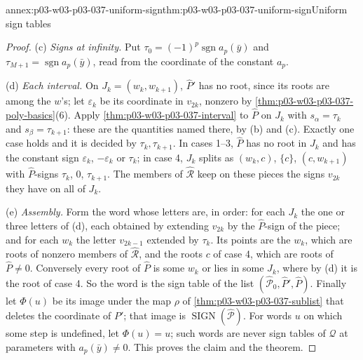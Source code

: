 \begin{annexitem}{annex:p03-w03-p03-037-uniform-sign}{thm:p03-w03-p03-037-uniform-sign}{Uniform sign tables}
\begin{proof}
(c) \emph{Signs at infinity.}  Put \(\tau_0=(-1)^p\operatorname{sgn}a_p(\bar y)\)
and \(\tau_{M+1}=\operatorname{sgn}a_p(\bar y)\), read from the coordinate of
the constant \(a_p\).

(d) \emph{Each interval.}  On \(J_k=(w_k,w_{k+1})\), \(\hat P'\) has no root,
since its roots are among the \(w\)'s; let \(\varepsilon_k\) be its
coordinate in \(v_{2k}\), nonzero by
\cref{thm:p03-w03-p03-037-poly-basics}(6).  Apply
\cref{thm:p03-w03-p03-037-interval} to \(\hat P\) on \(J_k\) with
\(s_\alpha=\tau_k\) and \(s_\beta=\tau_{k+1}\): these are the quantities named
there, by (b) and (c).  Exactly one case holds and it is decided by
\(\tau_k,\tau_{k+1}\).  In cases 1--3, \(\hat P\) has no root in \(J_k\) and
has the constant sign \(\varepsilon_k\), \(-\varepsilon_k\) or \(\tau_k\);
in case 4, \(J_k\) splits as \((w_k,c)\), \(\{c\}\), \((c,w_{k+1})\) with
\(\hat P\)-signs \(\tau_k\), \(0\), \(\tau_{k+1}\).  The members of
\(\hat{\mathcal R}\) keep on these pieces the signs \(v_{2k}\) they have on
all of \(J_k\).

(e) \emph{Assembly.}  Form the word whose letters are, in order: for each
\(J_k\) the one or three letters of (d), each obtained by extending
\(v_{2k}\) by the \(\hat P\)-sign of the piece; and for each
\(w_k\) the letter \(v_{2k-1}\) extended by \(\tau_k\).  Its points are the
\(w_k\), which are roots of nonzero members of \(\hat{\mathcal R}\), and the
roots \(c\) of case 4, which are roots of \(\hat P\neq0\).  Conversely every
root of \(\hat P\) is some \(w_k\) or lies in some \(J_k\), where by (d) it
is the root of case 4.  So the word is the sign table of the list
\((\hat{\mathcal P}_0,\hat P',\hat P)\).  Finally let \(\Phi(u)\) be its image
under the map \(\rho\) of \cref{thm:p03-w03-p03-037-sublist} that deletes the
coordinate of \(P'\); that image is \(\operatorname{SIGN}(\hat{\mathcal P})\).
For words \(u\) on which some step is undefined, let \(\Phi(u)=u\); such
words are never sign tables of \(\mathcal Q\) at parameters with
\(a_p(\bar y)\neq0\).  This proves the claim and the theorem.
\end{proof}
\end{annexitem}

